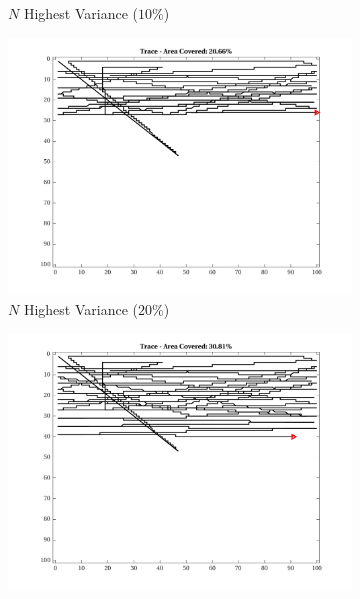 \begin{figure}[htb!]
\begin{subfigure}[t]{0.32\textwidth}
        \caption{$N$ Highest Variance ($10\%$)}
    \end{subfigure}%
    \begin{subfigure}[t]{0.32\textwidth}
        \centering
        \includegraphics[width=\linewidth]{figures/hbresults/path_nnhv_20p_100x100_sf_1_seed_2.png}
        \ssp
        \captionsetup{skip=0.20\baselineskip,size=footnotesize}
        \caption{$N$ Highest Variance ($20\%$)}
    \end{subfigure}%
    \begin{subfigure}[t]{0.32\textwidth}
        \centering
        \includegraphics[width=\linewidth]{figures/hbresults/path_nnhv_30p_100x100_sf_1_seed_2.png}
        \ssp
        \captionsetup{skip=0.20\baselineskip,size=footnotesize}

\end{subfigure}
\end{figure}
